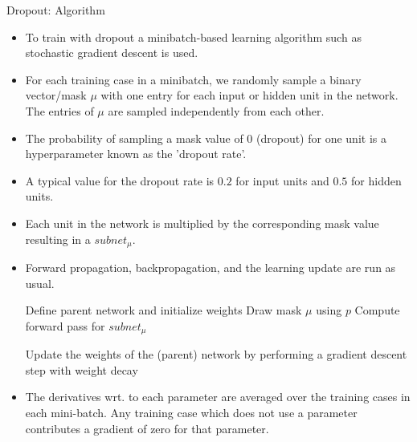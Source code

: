 \begin{vbframe}{Dropout: Algorithm}
  \begin{itemize}
    \item To train with dropout a minibatch-based learning algorithm such as stochastic gradient descent is used.  
    \item For each training case in a minibatch, we randomly sample a binary vector/mask $\mu$ with one entry for each input or hidden unit in the network. The entries of $\mu$ are sampled independently from each other. 
    \item The probability of sampling a mask value of 0 (dropout) for one unit is a hyperparameter known as the 'dropout rate'. 
    \item A typical value for the dropout rate is $0.2$ for input units and $0.5$ for hidden units. 
    \item Each unit in the network is multiplied by the corresponding mask value resulting in a $subnet_{\mu}$. 
    \item Forward propagation, backpropagation, and the learning update are run as usual.
  \framebreak
  \begin{algorithm}[H]
  \footnotesize
  \caption{Training a (parent) neural network with dropout rate $p$}
    \begin{algorithmic}[1]
      \State Define parent network and initialize weights
        \State Draw mask $\mu$ using $p$
        \State Compute forward pass for $subnet_{\mu}$
        \EndFor
        \State \parbox[t]{\dimexpr\linewidth-\algorithmicindent}{Update the weights of the (parent) network by performing a gradient descent step with weight decay}
      \EndFor
    \end{algorithmic}
  \end{algorithm}
    \item The derivatives wrt. to each parameter are averaged over the training cases in each mini-batch. Any training case which does not use a parameter contributes a gradient of zero for that parameter.
      \end{itemize}
\end{vbframe}

